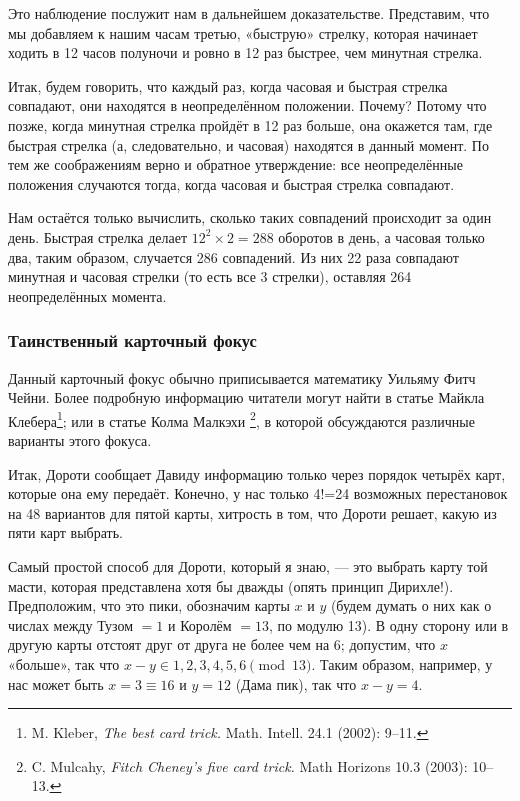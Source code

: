 Это наблюдение послужит нам в дальнейшем доказательстве.
Представим, что мы добавляем к нашим часам третью, «быструю» стрелку, которая начинает ходить в 12 часов полуночи и ровно в 12 раз быстрее, чем минутная стрелка.

Итак, будем говорить, что каждый раз, когда часовая и быстрая стрелка совпадают, они находятся в неопределённом положении.
Почему?
Потому что позже, когда минутная стрелка пройдёт в 12 раз больше, она окажется там, где быстрая стрелка (а, следовательно, и часовая) находятся в данный момент.
По тем же соображениям верно и обратное утверждение: все неопределённые положения случаются тогда, когда часовая и быстрая стрелка совпадают.

Нам остаётся только вычислить, сколько таких совпадений происходит за один день.
Быстрая стрелка делает $12^2\times 2 = 288$ оборотов в день, а часовая только два, таким образом, случается 286 совпадений.
Из них 22 раза совпадают минутная и часовая стрелки (то есть все 3 стрелки), оставляя 264 неопределённых момента. 
\heart

\subsubsection*{Таинственный карточный фокус}%

Данный карточный фокус обычно приписывается математику Уильяму Фитч Чейни. %
Более подробную информацию читатели могут найти в статье Майкла Клебера\footnote{M. Kleber, \emph{The best card trick.} Math. Intell. 24.1 (2002): 9--11.};
или в статье Колма Малкэхи%
\footnote{C. Mulcahy, \emph{Fitch Cheney's five card trick.} Math Horizons 10.3 (2003): 10--13.}, в которой обсуждаются различные варианты этого фокуса.

Итак, Дороти сообщает Давиду информацию только через порядок четырёх карт, которые она ему передаёт.
Конечно, у нас только 4!=24 возможных перестановок на 48 вариантов для пятой карты, хитрость в том, что Дороти решает, какую из пяти карт выбрать.

Самый простой способ для Дороти, который я знаю, --- это выбрать карту той масти, которая представлена хотя бы дважды (опять принцип Дирихле!).
Предположим, что это пики, обозначим карты $x$ и $y$ (будем думать о них как о числах между Тузом $= 1$ и Королём $= 13$, по модулю 13).
В одну сторону или в другую карты отстоят друг от друга не более чем на 6;
допустим, что $x$ «больше», так что $x-y\in {1,2,3,4,5,6} \pmod{13}$.
Таким образом, например, у нас может быть $x =3\equiv 16$ и $y = 12$ (Дама пик), так что $x - y = 4$.

